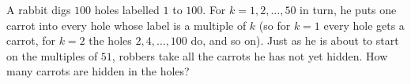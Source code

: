 A rabbit digs $100$ holes labelled $1$ to $100$. For $k=1,2,\dots,50$ in turn, he puts one carrot into every hole whose label is a multiple of $k$ (so for $k=1$ every hole gets a carrot, for $k=2$ the holes $2,4,\dots,100$ do, and so on). Just as he is about to start on the multiples of $51$, robbers take all the carrots he has not yet hidden. How many carrots are hidden in the holes?
